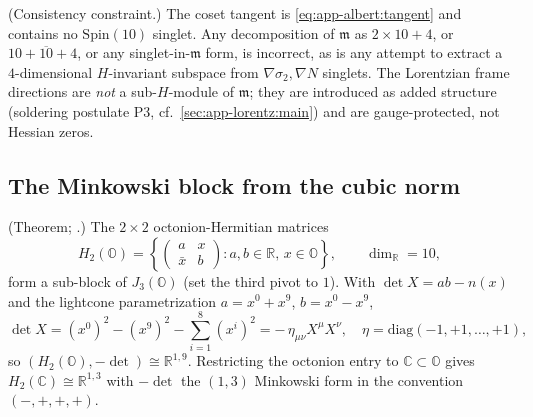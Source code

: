 \begin{remark}\label{rmk:app-albert:forbidden}
\textup{(Consistency constraint.)}
The coset tangent is \eqref{eq:app-albert:tangent} and contains no
$\mathrm{Spin}(10)$ singlet. Any decomposition of $\mathfrak m$ as $2\times10+4$,
or $10+\overline{10}+4$, or any singlet-in-$\mathfrak m$ form, is incorrect, as is
any attempt to extract a $4$-dimensional $H$-invariant subspace from
$\nabla\sigma_2,\nabla N$ singlets. The Lorentzian frame directions are
\emph{not} a sub-$H$-module of $\mathfrak m$; they are introduced as added
structure (soldering postulate P3, cf.\ \autoref{sec:app-lorentz:main}) and are
gauge-protected, not Hessian zeros.
\end{remark}

\subsection{The Minkowski block from the cubic norm}
\label{sec:app-albert:minkowski}

\begin{theorem}\label{thm:app-albert:minkowski}
\textup{(Theorem; \cite{Baez:2002,Sudbery:1984}.)}
The $2\times2$ octonion-Hermitian matrices
\begin{equation}\label{eq:app-albert:H2O}
  H_2(\mathbb O)=
  \left\{\begin{pmatrix}a & x\\ \bar x & b\end{pmatrix}:a,b\in\mathbb R,\,x\in
  \mathbb O\right\},
  \qquad \dim_{\mathbb R}=10,
\end{equation}
form a sub-block of $J_3(\mathbb O)$ (set the third pivot to $1$). With
$\det X=ab-n(x)$ and the lightcone parametrization $a=x^0+x^9$, $b=x^0-x^9$,
\begin{equation}\label{eq:app-albert:detmink}
  \det X=(x^0)^2-(x^9)^2-\textstyle\sum_{i=1}^{8}(x^i)^2
  =-\,\eta_{\mu\nu}X^\mu X^\nu,
  \quad \eta=\mathrm{diag}(-1,+1,\dots,+1),
\end{equation}
so $(H_2(\mathbb O),-\det)\cong\mathbb R^{1,9}$. Restricting the octonion entry to
$\mathbb C\subset\mathbb O$ gives $H_2(\mathbb C)\cong\mathbb R^{1,3}$ with
$-\det$ the $(1,3)$ Minkowski form in the convention $(-,+,+,+)$.
\end{theorem}

